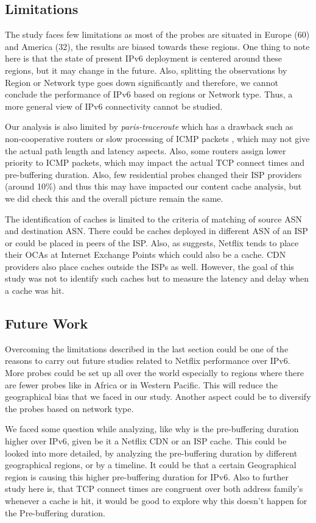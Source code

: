 \subsection*{Limitations}

The study faces few limitations as most of the probes are situated in Europe (60) and America (32), the results are biased towards these regions. One thing to note here is that the state of present IPv6 deployment is centered around these regions, but it may change in the future. 
Also, splitting the observations by Region or Network type goes down significantly and therefore, we cannot conclude the performance of IPv6 based on regions or Network type.
Thus, a more general view of IPv6 connectivity cannot be studied. 
 
Our analysis is also limited by \textit{paris-traceroute} which has a drawback such as non-cooperative routers or slow processing of ICMP packets \cite{viet}, which may not give the actual path length and latency aspects.
Also, some routers assign lower priority to ICMP packets, which may impact the actual TCP connect times and pre-buffering duration. Also, few residential probes changed their ISP providers (around 10\%) and thus this may have impacted our content cache analysis, but we did check this and the overall picture remain the same.  

The identification of caches is limited to the criteria of matching of source ASN and destination ASN. There could be caches deployed in different ASN of an ISP or could be placed in peers of the ISP.
Also, as \cite{openconnect} suggests, Netflix tends to place their OCAs at Internet Exchange Points which could also be a cache. CDN providers also place caches outside the ISPs as well.
However, the goal of this study was not to identify such caches but to measure the latency and delay when a cache was hit.


\subsection*{Future Work} 
Overcoming the limitations described in the last section could be one of the reasons to carry out future studies related to Netflix performance over IPv6. More probes could be set up all over the world especially to regions
where there are fewer probes like in Africa or in Western Pacific. This will reduce the geographical bias that we faced in our study. Another aspect could be to diversify the probes based on network type.

We faced some question while analyzing, like why is the pre-buffering duration higher over IPv6, given be it a Netflix CDN or an ISP cache. This could be looked into more detailed, by analyzing the pre-buffering duration by different geographical regions, or by a timeline. 
It could be that a certain Geographical region is causing this higher pre-buffering duration for IPv6. Also to further study here is, that TCP connect times are congruent over both address family's whenever a cache is hit, it would be good to explore why this doesn't happen for the Pre-buffering duration. 


